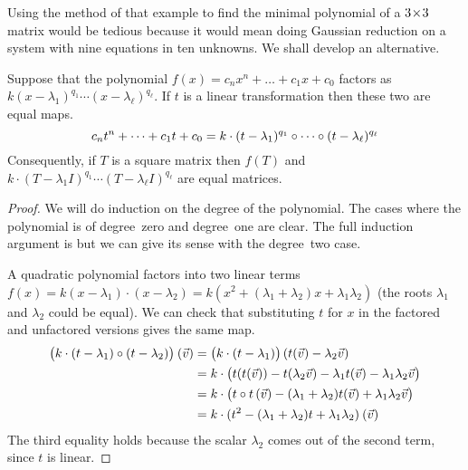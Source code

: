 Using the method of that example to find the minimal polynomial of a
\( 3 \! \times \! 3 \) matrix would be tedious because it 
would mean doing Gaussian reduction on
a system with nine equations in ten unknowns.
We shall develop an alternative.

\begin{lemma} \label{le:PolyMapsFactor}
Suppose that the polynomial \( f(x)=c_nx^n+\dots+c_1x+c_0 \) factors as
\( k(x-\lambda_1)^{q_1}\cdots(x-\lambda_\ell)^{q_\ell} \).
If \( t \) is a linear transformation then these two are equal maps. 
\begin{equation*}
  c_nt^n+\dots+c_1t+c_0
  =
  k\cdot(t-\lambda_1)^{q_1}\mathbin\circ \cdots\mathbin\circ 
      (t-\lambda_\ell)^{q_\ell} 
\end{equation*}
Consequently, if \( T \) is a square matrix then \( f(T) \) and
\( k\cdot(T-\lambda_1I)^{q_1}\cdots(T-\lambda_\ell I)^{q_\ell} \) 
are equal matrices.
\end{lemma}

\begin{proof}
We will do induction on the degree of the polynomial.
The cases where the polynomial is of
degree~zero and degree~one are clear.
The full induction argument is 
but we can give its sense with the degree~two case.

A quadratic polynomial factors into two
linear terms \( f(x)=k(x-\lambda_1)\cdot(x-\lambda_2)
                    =k(x^2+(\lambda_1+\lambda_2)x+\lambda_1\lambda_2) \)
(the roots $\lambda_1$ and $\lambda_2$ could be equal).
We can check that substituting \( t \) 
for \( x \) in the factored and
unfactored versions gives the same map.
\begin{align*}
   \bigl(k\cdot(t-\lambda_1)\mathbin\circ (t-\lambda_2)\bigr)\>(\vec{v})
   &=\bigl(k\cdot(t-\lambda_1)\bigr)\,(t(\vec{v})-\lambda_2\vec{v})    \\
   &=k\cdot\bigl(t(t(\vec{v}))-t(\lambda_2\vec{v})
      -\lambda_1 t(\vec{v})-\lambda_1\lambda_2\vec{v}\bigr)    \\
   &=k\cdot \bigl(t\mathbin\circ t\,(\vec{v})-(\lambda_1+\lambda_2)t(\vec{v})
          +\lambda_1\lambda_2\vec{v}\bigr)                    \\
   &=k\cdot(t^2-(\lambda_1+\lambda_2)t+\lambda_1\lambda_2)\>(\vec{v})
\end{align*}
The third equality holds because the scalar $\lambda_2$  comes out of the
second term, since \( t \) is linear.
\end{proof}

